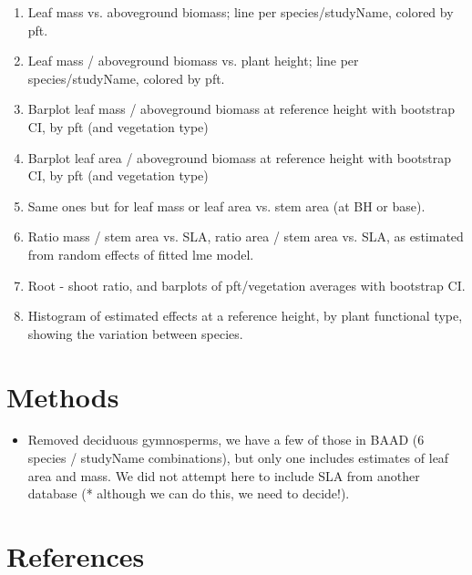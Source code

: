 \documentclass[a4paper]{article}
\begin{document}
\begin{enumerate}
  \item Leaf mass vs. aboveground biomass; line per species/studyName, colored by pft.
  \item Leaf mass / aboveground biomass vs. plant height; line per species/studyName, colored by pft.
  \item Barplot leaf mass / aboveground biomass at reference height with bootstrap CI, by pft (and vegetation type)
  \item Barplot leaf area / aboveground biomass at reference height with bootstrap CI, by pft (and vegetation type)
  \item Same ones but for leaf mass or leaf area vs. stem area (at BH or base).
  \item Ratio mass / stem area vs. SLA, ratio area / stem area vs. SLA, as estimated from random effects of fitted lme model.
  \item Root - shoot ratio, and barplots of pft/vegetation averages with bootstrap CI.
  \item Histogram of estimated effects at a reference height, by plant functional type, showing the variation between species. 
\end{enumerate}







\section{Methods}

\begin{itemize}
  \item Removed deciduous gymnosperms, we have a few of those in BAAD (6 species / studyName combinations), but only one includes estimates of leaf area and mass. We did not attempt here to include SLA from another database (* although we can do this, we need to decide!).
\end{itemize}




\section{References}

\end{document}
